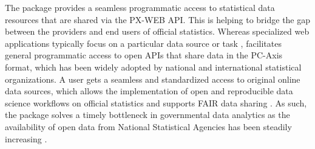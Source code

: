 


The  package provides a seamless programmatic access to
statistical data resources that are shared via the PX-WEB API. This is
helping to bridge the gap between the providers and end users of
official statistics. Whereas specialized web applications typically
focus on a particular data source or task \cite{xxx}, 
facilitates general programmatic access to open APIs that share data
in the PC-Axis format, which has been widely adopted by national and
international statistical organizations. A user gets a seamless and
standardized access to original online data sources, which allows the
implementation of open and reproducible data science workflows on
official statistics \citep{Gandrud13, Boettiger2015} and supports FAIR
data sharing \cite{xxx}. As such, the package solves a timely
bottleneck in governmental data analytics as the availability of open
data from National Statistical Agencies has been steadily increasing
\cite{xxx}.


